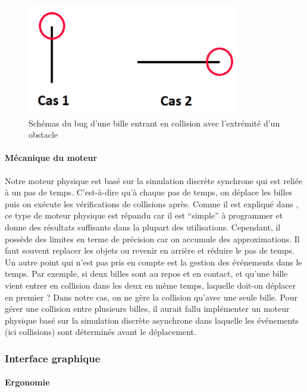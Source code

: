 \documentclass{report}
\begin{document}
\begin{figure}[H]
\centering
\includegraphics[scale=1]{bug_2.PNG}
\caption{Schémas du bug d'une bille entrant en collision avec l'extrémité d'un obstacle}
\end{figure}

\paragraph{Mécanique du moteur}

Notre moteur physique est basé sur la simulation discrète synchrone qui est reliée à un pas de temps. C’est-à-dire qu’à chaque pas de temps, on déplace les billes puis on exécute les vérifications de collisions après. Comme il est expliqué dans \cite{01}, ce type de moteur physique est répandu car il est “simple” à programmer et donne des résultats suffisants dans la plupart des utilisations. Cependant, il possède des limites en terme de précision car on accumule des approximations. Il faut souvent replacer les objets ou revenir en arrière et réduire le pas de temps. \\

Un autre point qui n’est pas pris en compte est la gestion des événements dans le temps. Par exemple, si deux billes sont au repos et en contact, et qu’une bille vient entrer en collision dans les deux en même temps, laquelle doit-on déplacer en premier ? Dans notre cas, on ne gère la collision qu’avec une seule bille. Pour gérer une collision entre plusieurs billes, il aurait fallu implémenter un moteur physique basé sur la simulation discrète asynchrone dans laquelle les événements (ici collisions) sont déterminés avant le déplacement.

\newpage
\subsubsection{Interface graphique}

\paragraph{Ergonomie}
\end{document}
